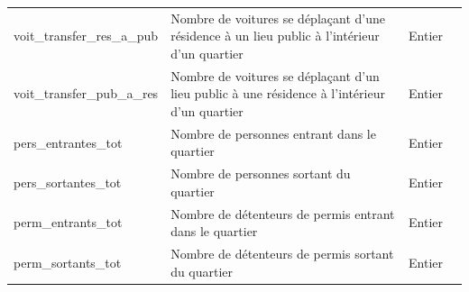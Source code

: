 {\begin{longtable}[c]{m{}|m{}m{}m{}}
                     voit\_transfer\_res\_a\_pub & Nombre de voitures se déplaçant d'une résidence à un lieu public à l'intérieur d'un quartier & Entier & \\
                     voit\_transfer\_pub\_a\_res & Nombre de voitures se déplaçant d'un lieu public à une résidence à l'intérieur d'un quartier & Entier & \\
                     pers\_entrantes\_tot & Nombre de personnes entrant dans le quartier & Entier & \\
                     pers\_sortantes\_tot & Nombre de personnes sortant du quartier & Entier & \\
                     perm\_entrants\_tot & Nombre de détenteurs de permis entrant dans le quartier & Entier & \\
                     perm\_sortants\_tot & Nombre de détenteurs de permis sortant du quartier & Entier & \\    
            \end{longtable}}
            
                
        
        \FloatBarrier    
